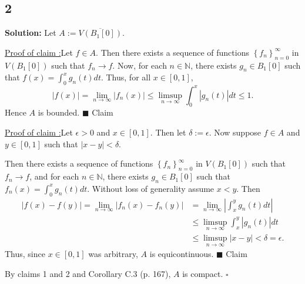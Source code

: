\documentclass[12pt]{article}
\newcounter{ProofCounter}
\newcounter{ClaimCounter}[ProofCounter]
\newenvironment{Solution}{\stepcounter{ProofCounter}\textbf{Solution:}}{\hfill$\square$}
\newenvironment{claim}[1]{\vspace{1mm}\stepcounter{ClaimCounter}\par\noindent\underline{\bf Claim \theClaimCounter:}\space#1}{}
\newenvironment{claimproof}[1]{\par\noindent\underline{Proof of claim \theClaimCounter:}\space#1}{\hfill $\blacksquare$ Claim \theClaimCounter}
\begin{document}
\subsection*{2}
\begin{Solution}
  Let $A := \overline{V(B_1[0])}$.

  \begin{claimproof}
    Let $f \in A$. Then there exists a sequence of functions $\left\{ f_n \right\}_{n=0}^{\infty}$ in $V(B_1[0])$ such that $f_n \rightarrow f$. Now, for each
    $n \in \mathbb{N}$, there exists $g_n \in B_1[0]$ such that $f(x) = \int_{0}^{x}g_n(t)dt$. Thus, for all $x \in [0,1]$,
    \[
      |f(x)| = \lim_{n\rightarrow\infty}|f_n(x)| \leq \limsup_{n\rightarrow\infty}\int_{0}^{x}|g_n(t)|dt \leq 1.
    \]
    Hence $A$ is bounded.
  \end{claimproof}

  \begin{claimproof}
    Let $\epsilon > 0$ and $x \in [0,1]$. Then let $\delta := \epsilon$. Now suppose $f \in A$ and $y \in [0,1]$ such that $|x - y| < \delta$. 
    
    Then there exists a sequence of functions $\left\{
    f_n \right\}_{n=0}^{\infty}$ in $V(B_1[0])$ such that $f_n \rightarrow f$, and for each $n \in \mathbb{N}$, there exists $g_n \in B_1[0]$ such that 
    $f_n(x) = \int_{0}^{x}g_n(t)dt$. Without loss of generality assume $x < y$. Then
    \begin{align*}
      |f(x) - f(y)| = \lim_{n\rightarrow\infty}|f_n(x) - f_n(y)| & = \lim_{n\rightarrow\infty}\left|\int_{x}^{y}g_n(t)dt\right| \\
      & \leq \limsup_{n\rightarrow\infty} \int_{x}^{y}|g_n(t)|dt \\
      & \leq \limsup_{n\rightarrow\infty} |x-y| < \delta = \epsilon.
    \end{align*}
    Thus, since $x \in [0,1]$ was arbitrary, $A$ is equicontinuous.
  \end{claimproof}

  By claims 1 and 2 and Corollary C.3 (p. 167), $A$ is compact.
\end{Solution}
\end{document}
